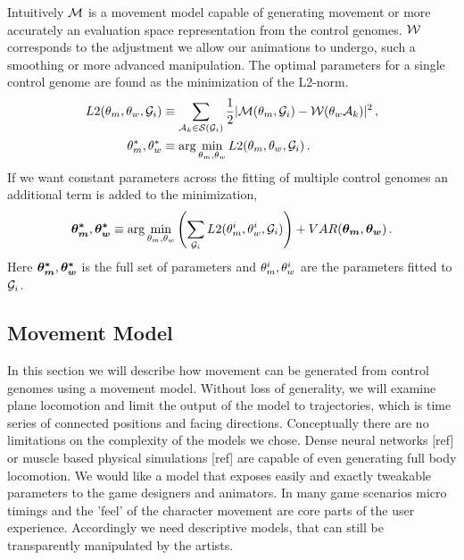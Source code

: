 Intuitively $\mathcal{M}$ is a movement model capable of generating movement or more accurately an evaluation space representation from the control genomes. $\mathcal{W}$ corresponds to the adjustment we allow our animations to undergo, such a smoothing or more advanced manipulation. The optimal parameters for a single control genome are found as the minimization of the L2-norm.
\begin{subequations}
\begin{align}
    {L2}(\theta_{m},\theta_{w},\mathcal{G}_i)
    &\equiv
    \sum_{\mathcal{A}_k\in\mathcal{S}(\mathcal{G}_i)}
    {
        \frac{1}{2}
        |\mathcal{M}(\theta_{m},\mathcal{G}_i)
        -
        \mathcal{W}(\theta_{w}\mathcal{A}_k)|^2
    }\,,
    \label{eq:optim:single}
    \\
    \theta_{m}^*,\theta_{w}^*
    &\equiv \arg\min_{\theta_{m},\theta_{w}}
    {
        {L2}(\theta_{m},\theta_{w},\mathcal{G}_i)
    }\,.
\end{align}
\end{subequations}
If we want constant parameters across the fitting of multiple control genomes an additional term is added to the minimization, 
\begin{equation}
    \boldsymbol{\theta_{m}^* },\boldsymbol{\theta_{w}^* }
    \equiv 
    \arg\min_{\theta_{m},\theta_{w}}
    \left(
        \sum_{\mathcal{G}_i}
        {L2}(\theta_{m}^i,\theta_{w}^i,\mathcal{G}_i)
    \right)
    +
    VAR(\boldsymbol{\theta_{m} },\boldsymbol{\theta_{w} })\,.
\end{equation}
Here $\boldsymbol{\theta_{m}^* },\boldsymbol{\theta_{w}^* }$ is the full set of parameters and $\theta_{m}^i,\theta_{w}^i$ are the parameters fitted to $\mathcal{G}_i$.

\subsection{Movement Model}
In this section we will describe how movement can be generated from control genomes using a movement model. Without loss of generality, we will examine plane locomotion and limit the output of the model to trajectories, which is time series of connected positions and facing directions. 
Conceptually there are no limitations on the complexity of the models we chose. Dense neural networks [ref] or muscle based physical simulations [ref] are capable of even generating full body locomotion. We would like a model that exposes easily and exactly tweakable parameters to the game designers and animators. In many game scenarios micro timings and the 'feel' of the character movement are core parts of the user experience. Accordingly we need descriptive models, that can still be transparently manipulated by the artists. 

